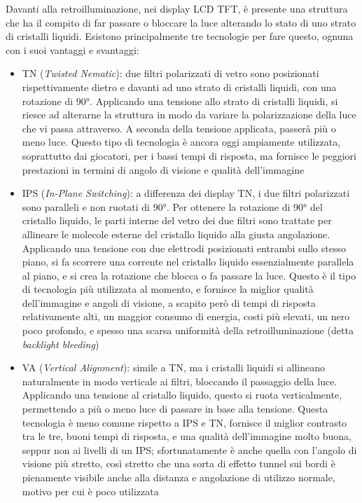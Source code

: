 Davanti alla retroilluminazione, nei display LCD TFT, è presente una struttura che ha il compito di far passare o bloccare la luce alterando lo stato di uno strato di cristalli liquidi. Esistono principalmente tre tecnologie per fare questo, ognuna con i suoi vantaggi e svantaggi:
\begin{itemize}
	\item TN (\textit{Twisted Nematic}): due filtri polarizzati di vetro sono posizionati rispettivamente dietro e davanti ad uno strato di cristalli liquidi, con una rotazione di 90°. Applicando una tensione allo strato di cristalli liquidi, si riesce ad alterarne la struttura in modo da variare la polarizzazione della luce che vi passa attraverso. A seconda della tensione applicata, passerà più o meno luce. Questo tipo di tecnologia è ancora oggi ampiamente utilizzata, soprattutto dai giocatori, per i bassi tempi di risposta, ma fornisce le peggiori prestazioni in termini di angolo di visione e qualità dell'immagine\cite{tftcentral_paneltech}
	\item IPS (\textit{In-Plane Switching}): a differenza dei display TN, i due filtri polarizzati sono paralleli e non ruotati di 90°. Per ottenere la rotazione di 90° del cristallo liquido, le parti interne del vetro dei due filtri sono trattate per allineare le molecole esterne del cristallo liquido alla giusta angolazione. Applicando una tensione con due elettrodi posizionati entrambi sullo stesso piano, si fa scorrere una corrente nel cristallo liquido essenzialmente parallela al piano, e si crea la rotazione che blocca o fa passare la luce. Questo è il tipo di tecnologia più utilizzata al momento, e fornisce la miglior qualità dell'immagine e angoli di visione, a scapito però di tempi di risposta relativamente alti, un maggior consumo di energia, costi più elevati, un nero poco profondo, e spesso una scarsa uniformità della retroilluminazione (detta \textit{backlight bleeding})\cite{tftcentral_paneltech}
	\item VA (\textit{Vertical Alignment}): simile a TN, ma i cristalli liquidi si allineano naturalmente in modo verticale ai filtri, bloccando il passaggio della luce. Applicando una tensione al cristallo liquido, questo si ruota verticalmente, permettendo a più o meno luce di passare in base alla tensione. Questa tecnologia è meno comune rispetto a IPS e TN, fornisce il miglior contrasto tra le tre, buoni tempi di risposta, e una qualità dell'immagine molto buona, seppur non ai livelli di un IPS; sfortunatamente è anche quella con l'angolo di visione più stretto\cite{mva1}\cite{tftcentral_paneltech}, così stretto che una sorta di effetto tunnel sui bordi è pienamente visibile anche alla distanza e angolazione di utilizzo normale, motivo per cui è poco utilizzata
\end{itemize}

